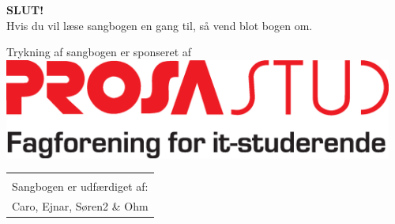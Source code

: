 \newpage
\pagestyle{empty}
\begin{center}
{\Huge \textbf{SLUT!}}\\
\vspace{6cm}
{\large Hvis du vil læse sangbogen en gang til, så vend blot bogen
  om.}\\

\vspace{3cm}

{\large Trykning af sangbogen er sponseret af}
\includegraphics[width=0.96\textwidth]{res/prosalogo.eps}


\begin{tabular}{c}
\vspace{3cm}
\\
Sangbogen er udfærdiget af:\\
Caro, Ejnar, Søren2 \& Ohm
\end{tabular}
\end{center}
